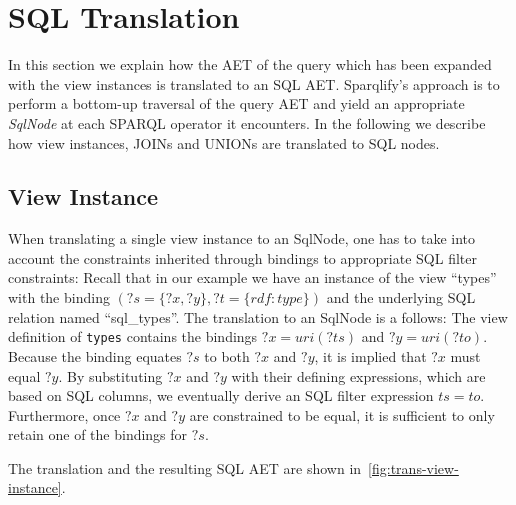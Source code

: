 \documentclass[a4paper,twoside,bibtotoc,abstracton,12pt,BCOR=15mm]{scrreprt}
\begin{document}


\section{SQL Translation}
In this section we explain how the AET of the query which has been expanded with the view instances is translated to an SQL AET.
Sparqlify's approach is to perform a bottom-up traversal of the query AET and yield an appropriate \emph{SqlNode} at each SPARQL operator it encounters.
In the following we describe how view instances, JOINs and UNIONs are translated to SQL nodes.


\subsection{View Instance}
When translating a single view instance to an SqlNode, one has to take into account the constraints
inherited through bindings to appropriate SQL filter constraints:
Recall that in our example we have an instance of the view ``types'' with the binding $(?s = \{?x, ?y\}, ?t = \{rdf:type\})$
and the underlying SQL relation named ``sql\_types''.
The translation to an SqlNode is a follows:
The view definition of \texttt{types} contains the bindings $?x = uri(?ts)$ and $?y = uri(?to)$.
Because the binding equates $?s$ to both $?x$ and $?y$, it is implied that $?x$ must equal $?y$. 
By substituting $?x$ and $?y$ with their defining expressions, which are based on SQL columns, we eventually derive an SQL filter expression $ts = to$.
Furthermore, once $?x$ and $?y$ are constrained to be equal, it is sufficient to only retain one of the bindings for $?s$.

The translation and the resulting SQL AET are shown in~\autoref{fig:trans-view-instance}. 
\end{document}
